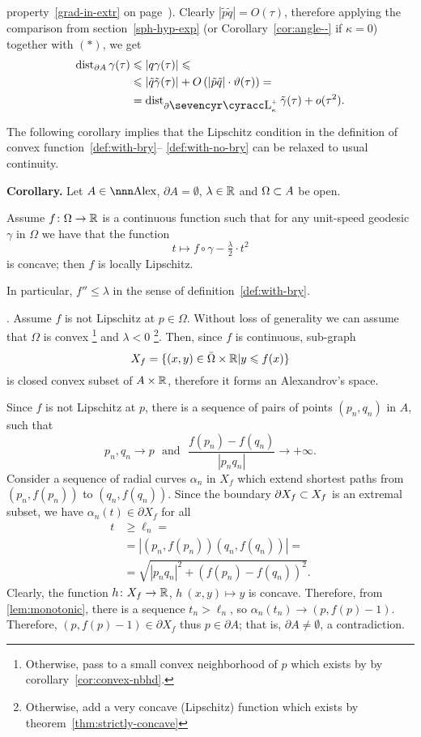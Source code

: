 \documentclass{article}
\begin{document}
property~\ref{grad-in-extr} on page~\pageref{grad-in-extr}).
Clearly $|\tilde p\tilde q|=O(\tau)$, therefore applying the comparison from
section~\ref{sph-hyp-exp} (or Corollary~\ref{cor:angle--} if $\kappa=0$)
together with $(*)$, we get
\begin{align*}
\dist_{\partial A} \gamma(\tau) 
&\le|q \gamma(\tau)|
\le
\\
&\le|\tilde q\tilde\gamma(\tau)|+O\l(|\tilde p\tilde q|\cdot\theta(\tau)\r)
=
\\
&=\dist_{\partial\Lobs_\kappa^+}\tilde\gamma(\tau)+o(\tau^2).
\end{align*}
\qedsf





The following corollary implies that the Lipschitz condition in the definition of
convex function~\ref{def:with-bry}-- \ref{def:with-no-bry} can be relaxed to usual continuity.

\begin{thm}{\bf Corollary.}\label{cor:cont-conv} Let $A\in\Alex$, $\partial A=\emptyset$,
$\lambda\in\mathbb{R}$ and $\Omega\subset A$ be open.

Assume $f\colon\Omega\to\mathbb{R}$ is a continuous function such that for any unit-speed geodesic $\gamma$ in $\Omega$ we have that the function
$$t\mapsto f\circ\gamma-\tfrac\lambda2{\cdot}t^2$$
is concave; then $f$ is locally Lipschitz.
 
In particular, $f''\le \lambda$ in the sense of
definition~\ref{def:with-bry}.
\end{thm}

\Proof. Assume $f$ is not Lipschitz at $p\in \Omega$.
Without loss of generality we can assume that $\Omega$ is
convex%
\footnote{Otherwise, pass to a small convex neighborhood of $p$ which
exists by by corollary~\ref{cor:convex-nbhd}.} 
and $\lambda<0$%
\footnote{Otherwise, add a very concave (Lipschitz) function which
exists by theorem~\ref{thm:strictly-concave}}.
Then, since $f$ is continuous, sub-graph
$$X_f=\{(x,y)\in \bar\Omega\times\mathbb{R}|y\leqslant f(x)\}$$
is closed convex subset of $A\times\mathbb{R}$, therefore it forms an Alexandrov's
space. 

Since $f$ is not Lipschitz at $p$, there is a sequence of pairs of points
$(p_n,q_n)$ in $A$, such that 
$$p_n,q_n\to p\ \ \ \text{and}\ \ \  \frac{f(p_n)-f(q_n)}{|p_n
q_n|}\to+\infty.$$ 
Consider a sequence of radial curves $\alpha_n$ in $X_f$ which extend  shortest
paths from $(p_n,f(p_n))$ to $(q_n,f(q_n))$.
Since the boundary $\partial X_f\subset X_f$ is an extremal subset, we have $\alpha_n(t)\in
\partial X_f$ for all 
\begin{align*}
t
&\ge \ell_n
=
\\
&=|(p_n,f(p_n))(q_n,f(q_n))|
=
\\
&=\sqrt{|p_n
q_n|^2+(f(p_n)-f(q_n))^2}.
\end{align*}
Clearly, the function $h\colon X_f\to\mathbb{R}$, $h\:(x,y)\mapsto y$ is concave.
Therefore, from \ref{lem:monotonic}, there is a sequence $t_n>\ell_n$, so
$\alpha_n(t_n)\to (p,f(p)-1)$.
Therefore, $(p,f(p)-1)\in\partial X_f$ thus $p\in\partial A$;
that is, $\partial A\not=\emptyset$, a
contradiction.
\qeds
\end{document}
